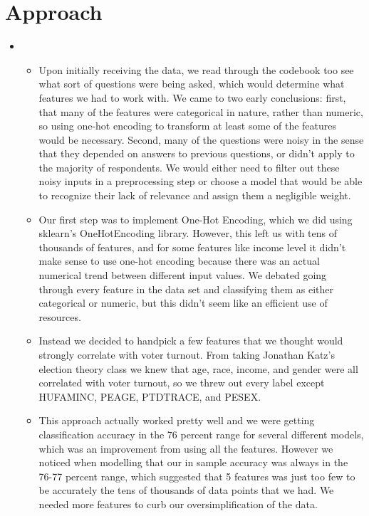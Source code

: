 \section{Approach}
\medskip
\begin{itemize}

    \item {}
    \begin{itemize}
    \item Upon initially receiving the data, we read through the codebook too see what sort of questions were being asked, which would determine what features we had to work with. We came to two early conclusions: first, that many of the features were
    categorical in nature, rather than numeric, so using one-hot encoding to transform at least some of the features would be necessary. Second, many of the questions were noisy in the sense that they depended on answers to previous questions, or didn't apply to the majority of respondents. We would either need to filter out these noisy inputs in a preprocessing step or choose a model that would be able to recognize their lack of relevance and assign them a negligible weight.

    \item Our first step was to implement One-Hot Encoding, which we did using sklearn's OneHotEncoding library. However,
    this left us with tens of thousands of features, and for some features like income level it didn't make sense to use
    one-hot encoding because there was an actual numerical trend between different input values. We debated going through every
    feature in the data set and classifying them as either categorical or numeric, but this didn't seem like an efficient use of resources.

    \item Instead we decided to handpick a few features that we thought would strongly correlate with voter turnout. From taking Jonathan Katz's election theory class we knew that age, race, income, and gender were all correlated with voter turnout,
    so we threw out every label except HUFAMINC, PEAGE, PTDTRACE, and PESEX.

    \item This approach actually worked pretty well and we were getting classification accuracy in the 76 percent range for
    several different models, which was an improvement from using all the features. However we noticed when modelling that
    our in sample accuracy was always in the 76-77 percent range, which suggested that 5 features was just too few to be 
    accurately the tens of thousands of data points that we had. We needed more features to curb our oversimplification of the
    data.


\end{itemize}
\end{itemize}
